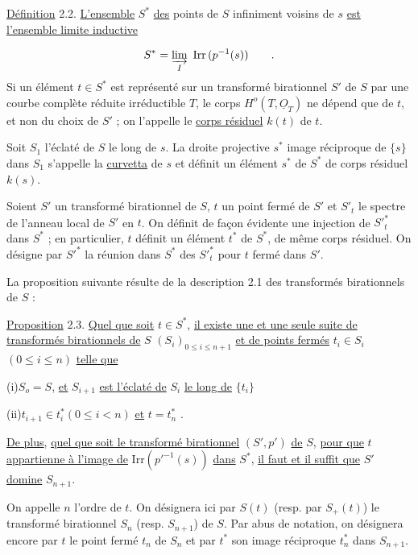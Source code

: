 \underline{Définition} 2.2. \underline{L'ensemble} $S^*$ \underline{des} points de $S$ infiniment voisins de $s$ \underline{est} \underline{l'ensemble limite inductive}

\begin{equation*}
S^* = \varinjlim_{I} \ \mathrm{Irr}\,(p^{-1}(s)) \qquad .
\end{equation*}
Si un élément $t \in S^*$ est représenté sur un transformé birationnel $S'$ de $S$ par une courbe complète réduite irréductible $T$, le corps $H^o(T,\underline{O}_T)$ ne dépend que de $t$, et non du choix de $S'$ ; on l'appelle le \underline{corps résiduel} $k(t)$ de $t$.

Soit $S_1$ l'éclaté de $S$ le long de $s$. La droite projective $s^*$ image réciproque de $\{s\}$ dans $S_1$ s'appelle la \underline{curvetta} de $s$ et définit un élément $s^*$ de $S^*$ de corps résiduel $k(s)$.

Soient $S'$ un transformé birationnel de $S$, $t$ un point fermé de $S'$ et $S'_t$ le spectre de l'anneau local de $S'$ en $t$. On définit de façon évidente une injection de ${S'}^*_t$ dans $S^*$ ; en particulier, $t$ définit un élément $t^*$ de $S^*$, de même corps résiduel. On désigne par ${S'}^*$ la réunion dans $S^*$ des ${S'}^*_t$ pour $t$ fermé dans $S'$.

La proposition suivante résulte de la description 2.1 des transformés birationnels de $S$ :



\underline{Proposition} 2.3. \underline{Quel que soit} $t \in S^*$, \underline{il existe une et une seule suite de transformés birationnels de} $S$ $(S_i)_{0 \leqslant i \leqslant n+1}$ \underline{et de points fermés} $t_i \in S_i$ $(0 \leqslant i \leqslant n)$ \underline{telle que}

(i)\quad $S_o = S$, \underline{et} $S_{i+1}$ \underline{est l'éclaté de} $S_i$ \underline{le long de} $\{t_i\}$

(ii)\quad $t_{i+1} \in t_i^*$\quad $(0 \leqslant i < n)$ \underline{et} $t = t_n^*$ .

\underline{De plus}, \underline{quel que soit le transformé birationnel} $(S',p')$ \underline{de} $S$, \underline{pour que} $t$ \underline{appartienne à l'image de} $\mathrm{Irr}({p'}^{-1}(s))$ \underline{dans} $S^*$, \underline{il faut et il suffit que} $S'$ \underline{domine} $S_{n+1}$.

On appelle $n$ l'ordre de $t$. On désignera ici par $S(t)$ (resp. par $S_+(t)$) le transformé birationnel $S_n$ (resp. $S_{n+1}$) de $S$. Par abus de notation, on désignera encore par $t$ le point fermé $t_n$ de $S_n$ et par $t^*$ son image réciproque $t_n^*$ dans $S_{n+1}$.

